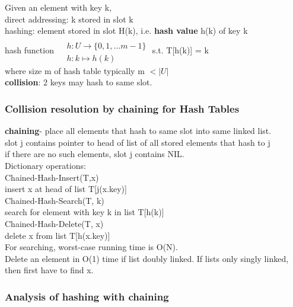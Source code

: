 \documentclass[10pt]{amsart}
\begin{document}
\begin{multicols*}{2}
Given an element with key k, \\
direct addressing: k stored in slot k \\
hashing: element stored in slot H(k), i.e. \textbf{hash value} h(k) of key k \\
hash function $\begin{aligned} & \quad \\ 
& h : U \to \lbrace 0, 1, \dots m -1 \rbrace \\
& h:k \mapsto h(k) \end{aligned}$ s.t. T[h(k)] = k \\

where size m of hash table typically m $< |U|$ \\

\textbf{collision}: 2 keys may hash to same slot. 

\subsubsection{Collision resolution by chaining for Hash Tables}

\textbf{chaining}- place all elements that hash to same slot into same linked list. \\
slot j contains pointer to head of list of all stored elements that hash to j \\
if there are no such elements, slot j contains NIL. \\

Dictionary operations: \\
Chained-Hash-Insert(T,x) \\
\quad insert x at head of list T[j(x.key)] \\

Chained-Hash-Search(T, k) \\
\quad search for element with key k in list T[h(k)] \\

Chained-Hash-Delete(T, x) \\
\quad delete x from list T[h(x.key)] \\

 
For searching, worst-case running time is O(N). \\
Delete an element in O(1) time if list doubly linked. If lists only singly linked, then first have to find x.
 
\subsubsection{Analysis of hashing with chaining}
 

\end{multicols*}
\end{document}
